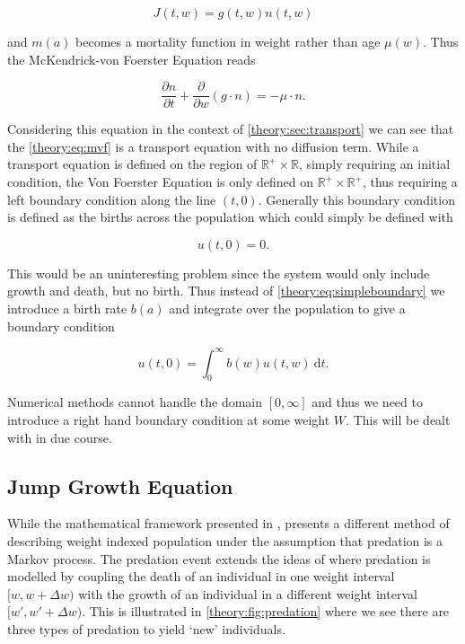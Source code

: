 \documentclass[../main.tex]{subfiles}
\begin{document}
  \begin{equation}
    J(t, w) = g(t, w) n(t, w)
  \end{equation}

  and $m(a)$ becomes a mortality function in weight rather than age $\mu(w)$. Thus the McKendrick-von Foerster Equation reads

  \begin{equation}\label{theory:eq:mvf}
    \frac{\partial n}{\partial t} + \frac{\partial}{\partial w} \left(g \cdot n \right) = - \mu \cdot n.
  \end{equation}

  Considering this equation in the context of \autoref{theory:sec:transport} we can see that the \autoref{theory:eq:mvf} is a transport equation with no diffusion term. While a transport equation is defined on the region of $\mathbb{R^+} \times \mathbb{R}$, simply requiring an initial condition, the Von Foerster Equation is only defined on $\mathbb{R^+} \times \mathbb{R^+}$, thus requiring a left boundary condition along the line $(t, 0)$. Generally this boundary condition is defined as the births across the population which could simply be defined with

  \begin{equation}\label{theory:eq:simpleboundary}
    u(t, 0) = 0.
  \end{equation}

  This would be an uninteresting problem since the system would only include growth and death, but no birth. Thus instead of \autoref{theory:eq:simpleboundary} we introduce a birth rate $b(a)$ and integrate over the population to give a boundary condition

  \begin{equation}\label{theory:eq:boundary}
    u(t, 0) = \int_0^{\infty} b(w) u(t, w) \: \mathrm{d}t.
  \end{equation}

  Numerical methods cannot handle the domain $[0, \infty]$ and thus we need to introduce a right hand boundary condition at some weight $W$. This will be dealt with in due course.

  \subsection{Jump Growth Equation}\label{theory:sec:jumpgrowth}
  While the mathematical framework presented in \cite{silvert1978}, \cite{datta2010} presents a different method of describing weight indexed population under the assumption that predation is a Markov process. The predation event extends the ideas of \cite{silvert1980} where predation is modelled by coupling the death of an individual in one weight interval $[w, w + \Delta w)$ with the growth of an individual in a different weight interval $[w', w' + \Delta w)$. This is illustrated in \autoref{theory:fig:predation} where we see there are three types of predation to yield `new' individuals.
\end{document}
